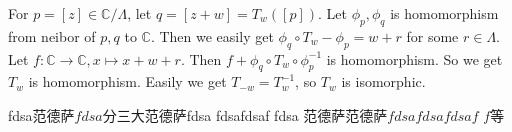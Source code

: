 \documentclass{ctexart}
\begin{document}
\begin{solution}
  For \(p=[z]\in \mathbb{C} / \Lambda\), let \(q=[z+w]=T_w([p])\). 
  Let \(\phi_p,\phi_q\) is homomorphism from neibor of \(p,q\) to \(\mathbb{C}\). Then we easily get \(\phi_q \circ T_w-\phi_p=w+r\) for some \(r \in \Lambda\). 
  Let \(f:\mathbb{C} \to \mathbb{C},x \mapsto x+w+r\). Then \(f+\phi_q \circ T_w \circ \phi_p^{-1}\) is homomorphism. 
  So we get \(T_w\) is homomorphism. 
  Easily we get \(T_{-w}=T_w^{-1}\), so \(T_w\) is isomorphic. 
\end{solution}

fdsa范德萨\(fdsa\)分三大范德萨fdsa fdsafdsaf fdsa 范德萨范德萨\(fdsafdsafdsaf\,\, f\)等
\end{document}
